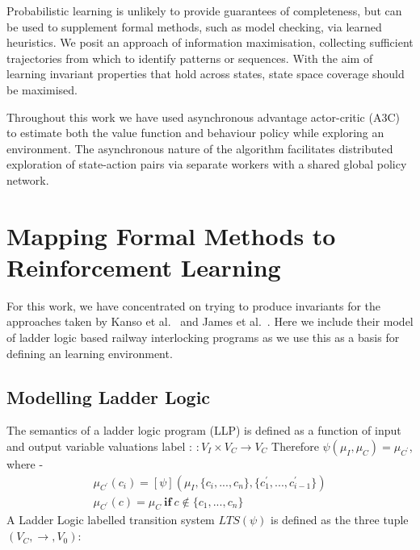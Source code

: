 \documentclass[conference,compsoc]{IEEEtran}
\begin{document}
Probabilistic learning is unlikely to provide guarantees of completeness, but can be used to supplement formal methods, such as model checking, via learned heuristics. We posit an approach of information maximisation, collecting sufficient trajectories from which to identify patterns or sequences. With the aim of learning invariant properties that hold across states, state space coverage should be maximised. 

Throughout this work we have used asynchronous advantage actor-critic (A3C) to estimate both the value function and behaviour policy while exploring an environment. The asynchronous nature of the algorithm facilitates distributed exploration of state-action pairs via separate workers with a shared global policy network.


\section{Mapping Formal Methods to Reinforcement Learning} \label{sec:mapping_fm_to_ml}
For this work, we have concentrated on trying to produce invariants for the approaches taken by Kanso et al.~\cite{kanso2009automated} and James et al.~\cite{james2013verification}. Here we include their model of ladder logic based railway interlocking programs as we use this as a basis for defining an  learning environment. 
\subsection{Modelling Ladder Logic}
The semantics of a ladder logic program (LLP) is defined as a function of input and output variable valuations  label :
\begin{math}
	[\psi] : V_I \times V_C \to V_C 
\end{math}
 Therefore
 \begin{math}
 	\psi(\mu_I, \mu_C) = \mu_{C^\prime}
 \end{math}, where
-
\begin{align}
\mu_{C^\prime}(c_i) = [\psi](\mu_I, \{c_i,...,c_n\}, \{c^\prime_1,...,c^\prime_{i-1}\}) \\
\mu_{C^\prime}(c) = \mu_C \ \mathbf{if} \ c \notin \{c_1,...,c_n\}
\end{align}
A Ladder Logic labelled transition system $LTS(\psi)$ is defined as the three tuple $(V_C, \to, V_0)$:
\end{document}
